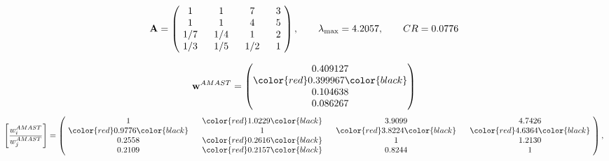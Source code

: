 \begin{example}
\begin{equation*}
\mathbf{A} =
\begin{pmatrix}
$\,\,$ 1 $\,\,$ & $\,\,$1$\,\,$ & $\,\,$7$\,\,$ & $\,\,$3 $\,\,$ \\
$\,\,$ 1 $\,\,$ & $\,\,$ 1 $\,\,$ & $\,\,$4$\,\,$ & $\,\,$5 $\,\,$ \\
$\,\,$ 1/7$\,\,$ & $\,\,$ 1/4$\,\,$ & $\,\,$ 1 $\,\,$ & $\,\,$2 $\,\,$ \\
$\,\,$ 1/3$\,\,$ & $\,\,$ 1/5$\,\,$ & $\,\,$ 1/2$\,\,$ & $\,\,$ 1  $\,\,$ \\
\end{pmatrix},
\qquad
\lambda_{\max} =
4.2057,
\qquad
CR = 0.0776
\end{equation*}

\begin{equation*}
\mathbf{w}^{AMAST} =
\begin{pmatrix}
0.409127\\
\color{red} 0.399967\color{black} \\
0.104638\\
0.086267
\end{pmatrix}\end{equation*}
\begin{equation*}
\left[ \frac{{w}^{AMAST}_i}{{w}^{AMAST}_j} \right] =
\begin{pmatrix}
$\,\,$ 1 $\,\,$ & $\,\,$\color{red} 1.0229\color{black} $\,\,$ & $\,\,$3.9099$\,\,$ & $\,\,$4.7426$\,\,$ \\
$\,\,$\color{red} 0.9776\color{black} $\,\,$ & $\,\,$ 1 $\,\,$ & $\,\,$\color{red} 3.8224\color{black} $\,\,$ & $\,\,$\color{red} 4.6364\color{black}   $\,\,$ \\
$\,\,$0.2558$\,\,$ & $\,\,$\color{red} 0.2616\color{black} $\,\,$ & $\,\,$ 1 $\,\,$ & $\,\,$1.2130 $\,\,$ \\
$\,\,$0.2109$\,\,$ & $\,\,$\color{red} 0.2157\color{black} $\,\,$ & $\,\,$0.8244$\,\,$ & $\,\,$ 1  $\,\,$ \\
\end{pmatrix},
\end{equation*}


\end{example}
